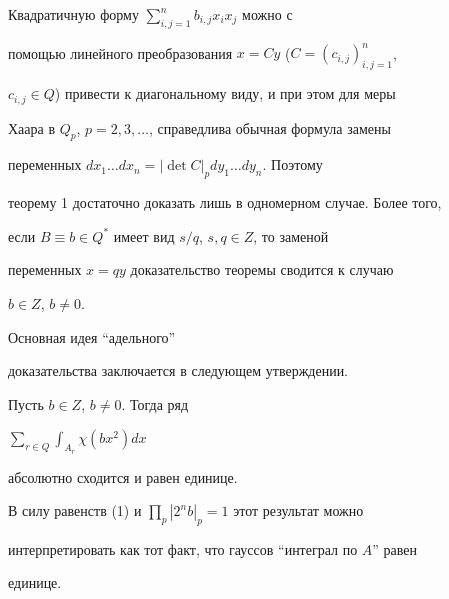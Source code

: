  


Квадратичную форму $\sum\limits^n_{i,j=1}b_{i,j}x_i x_j$ можно с 


помощью линейного преобразования $x= C y$ ($C=(c_{i,j})^n_{i,j=1}$, 


$c_{i,j}\in Q$) привести к диагональному виду, и при этом для меры 


Хаара в $Q_p$, $p=2,3,\dotsc$, справедлива обычная формула замены 


переменных $d x_1\dotsc d x_n=|\det C|_pd y_1\dotsc d y_n$. Поэтому 


теорему 1 достаточно доказать лишь в одномерном случае. Более того, 


если $B\equiv b\in Q^*$ имеет вид $s/q$, $s,q\in Z$, то заменой 


переменных $x=q y$ доказательство теоремы сводится к случаю


$b\in Z$, $b\ne0$. 


 


Основная идея ``адельного''


доказательства заключается в следующем утверждении. 


 


\begin{lemnonum} 


Пусть $b\in Z$, $b\ne0$. Тогда ряд 


$\displaystyle\sum\limits_{r\in Q}\int_{A_r}\chi(b x^2)d x$ 


абсолютно сходится и равен единице. 


\end{lemnonum} 


 


В силу равенств (1) и $\prod\limits_p|2^n b|_p=1$ этот результат можно 


интерпретировать как тот факт, что гауссов ``интеграл по $A$'' равен 


единице. 


 


